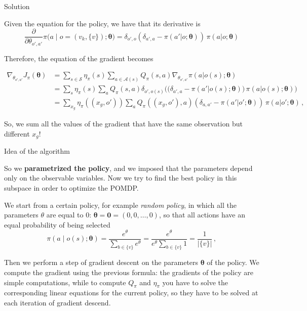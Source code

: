 \documentclass[10pt, aspectratio=169, compress, protectframetitle, handout]{beamer}
\begin{document}
\begin{frame}{Solution}
    
    Given the equation for the policy, we have that its derivative is
    \begin{equation*}
            \frac{\partial}{\partial \theta_{o',a'}} \pi \Big( a \;\big|\; o=(v_k, \{v\}); \boldsymbol \theta \Big) = \delta_{o',o} \left( \delta_{a',a} - \pi(a'|o; \boldsymbol \theta) \right) \, \pi(a|o; \boldsymbol \theta)
    \end{equation*}
    
    Therefore, the equation of the gradient becomes
    
    \begin{align*}
            \nabla_{\theta_{o',a'}} J_\pi (\boldsymbol \theta)
            &= \sum_{s \in \mathcal S} \eta_\pi(s) \sum_{a \in \mathcal A(s)} Q_\pi(s,a) \nabla_{\theta_{o',a'}} \pi(a|o(s); \boldsymbol \theta) \\
            &= \sum_s \eta_\pi(s) \sum_a Q_\pi(s,a) \delta_{o',o(s)} \Big( \big( \delta_{a',a} - \pi(a'|o(s); \boldsymbol \theta) \big) \, \pi(a|o(s); \boldsymbol \theta) \Big) \\
            &= \sum_{x_g} \eta_\pi((x_g, o')) \sum_a Q_\pi((x_g, o'),a) \left( \delta_{a,a'} - \pi(a'|o'; \boldsymbol \theta) \right) \, \pi(a|o'; \boldsymbol \theta) \, ,
    \end{align*}
    
    \alert{So, we sum all the values of the gradient that have the same observation but different $x_g$!}
    
\end{frame}

\begin{frame}{Idea of the algorithm}

    So we \textbf{parametrized the policy}, and we imposed that the parameters depend only on the observable variables. Now we try to find the best policy in this subspace in order to optimize the POMDP.
    
    \alert{We start from a certain policy}, for example \emph{random policy}, in which all the parameters $\theta$ are equal to $0$: $\boldsymbol \theta = \mathbf 0 = (0, 0, \ldots, 0)$, so that all actions have an equal probability of being selected
    \begin{equation*}
        \pi \left( a \;\big|\; o(s); \boldsymbol \theta \right) = \frac{e^{\theta}}{\sum_{b \in \{v\}} e^{\theta}} = \frac{e^{\theta}}{e^{\theta} \sum_{b \in \{v\}} 1 } = \frac1{ |\{v\}| } \, ,
    \end{equation*}
    
    Then we perform a \alert{step of gradient descent on the parameters $\boldsymbol \theta$ of the policy}. We compute the gradient using the previous formula: the gradients of the policy are simple computations, while to compute $Q_\pi$ and $\eta_\pi$ you have to solve the corresponding linear equations for the current policy, so they \alert{have to be solved at each iteration of gradient descend}.
    
\end{frame}
\end{document}
